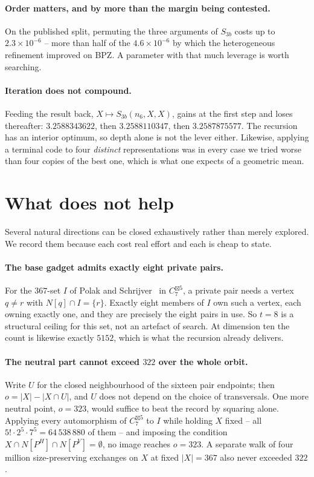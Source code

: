 \documentclass[11pt]{article}
\theoremstyle{definition}
\begin{document}
\paragraph{Order matters, and by more than the margin being contested.}
On the published split, permuting the three arguments of $S_{3b}$ costs up to
$2.3 \times 10^{-6}$ -- more than half of the $4.6 \times 10^{-6}$ by which the heterogeneous
refinement improved on BPZ. A parameter with that much leverage is worth searching.

\paragraph{Iteration does not compound.}
Feeding the result back, $X \mapsto S_{3b}(n_6, X, X)$, gains at the first step and loses
thereafter: $3.2588343622$, then $3.2588110347$, then $3.2587875577$. The recursion has an
interior optimum, so depth alone is not the lever either. Likewise, applying a terminal code to
four \emph{distinct} representations was in every case we tried worse than four copies of the
best one, which is what one expects of a geometric mean.

\section{What does not help}

Several natural directions can be closed exhaustively rather than merely explored. We record them
because each cost real effort and each is cheap to state.

\paragraph{The base gadget admits exactly eight private pairs.}
For the $367$-set $I$ of Polak and Schrijver~\cite{PS} in $C_7^{\boxtimes 5}$, a private pair needs a vertex
$q \neq r$ with $N[q] \cap I = \{r\}$. Exactly eight members of $I$ own such a vertex, each owning
exactly one, and they are precisely the eight pairs in use. So $t = 8$ is a structural ceiling for
this set, not an artefact of search. At dimension ten the count is likewise exactly $5152$, which
is what the recursion already delivers.

\paragraph{The neutral part cannot exceed $322$ over the whole orbit.}
Write $U$ for the closed neighbourhood of the sixteen pair endpoints; then $o = |X| - |X \cap U|$,
and $U$ does not depend on the choice of transversals. One more neutral point, $o = 323$, would
suffice to beat the record by squaring alone. Applying every automorphism of $C_7^{\boxtimes 5}$
to $I$ while holding $X$ fixed -- all $5! \cdot 2^5 \cdot 7^5 = 64\,538\,880$ of them -- and
imposing the condition $X \cap N[P^H] \cap N[P^V] = \emptyset$, no image reaches $o = 323$.
A separate walk of four million size-preserving exchanges on $X$ at fixed $|X| = 367$ also never
exceeded $322$.
\end{document}
